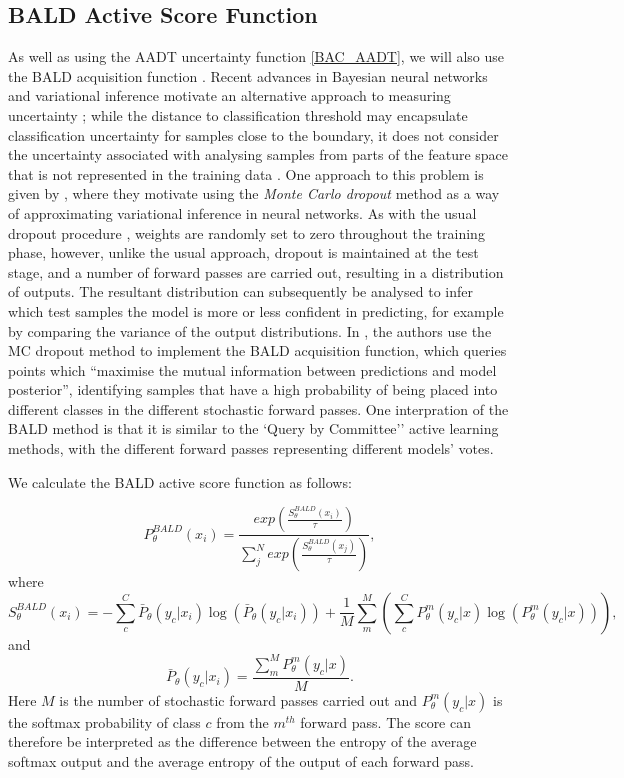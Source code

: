 \subsection{BALD Active Score Function}
As well as using the AADT uncertainty function \ref{BAC_AADT}, we will also use the BALD acquisition function\cite{houlsby2011bayesian} \cite{gal2017deep}. Recent advances in Bayesian neural networks and variational inference motivate an alternative approach to measuring uncertainty \cite{gal2016uncertainty}; while the distance to classification threshold may encapsulate classification uncertainty for samples close to the boundary, it does not consider the uncertainty associated with analysing samples from parts of the feature space that is not represented in the training data \cite{gal2016uncertainty}. One approach to this problem is given by \cite{gal2016dropout}, where they motivate using the \textit{Monte Carlo dropout} method as a way of approximating variational inference in neural networks. As with the usual dropout procedure \cite{srivastava2014dropout}, weights are randomly set to zero throughout the training phase, however, unlike the usual approach, dropout is maintained at the test stage, and a number of forward passes are carried out, resulting in a distribution of outputs. The resultant distribution can subsequently be analysed to infer which test samples the model is more or less confident in predicting, for example by comparing the variance of the output distributions. In \cite{gal2017deep}, the authors use the MC dropout method to implement the BALD acquisition function, which queries points which ``maximise the mutual information between predictions and model posterior'', identifying samples that have a high probability of being placed into different classes in the different stochastic forward passes. One interpration of the BALD method is that it is similar to the `Query by Committee'' active learning methods, with the different forward passes representing different models' votes. 

We calculate the BALD active score function as follows:

\begin{equation}
P_{\theta}^{BALD} (x_i) = \frac{exp(\frac{S^{BALD}_{\theta}(x_i)}{\tau})}{\sum_{j}^{N} exp(\frac{S^{BALD}_{\theta}(x_j)}{\tau})},
\end{equation}
where
\begin{equation}
S^{BALD}_{\theta}(x_i) = - \sum_{c}^{C} \bar{P}_{\theta}(y_c|x_i)\log( \bar{P}_{\theta}(y_c|x_i)) + \frac{1}{M} \sum_{m}^{M} (\sum_{c}^{C} P^{m}_{\theta}(y_c|x)\log(P^{m}_{\theta}(y_c|x))),
\end{equation}
and
\begin{equation}
 \bar{P}_{\theta}(y_c|x_i) = \frac{\sum_{m}^{M}P^{m}_{\theta}(y_c|x)}{M}. 
\end{equation}
Here $M$ is the number of stochastic forward passes carried out and $P^{m}_{\theta}(y_c|x)$ is the softmax probability of class $c$ from the $m^{th}$ forward pass. The score can therefore be interpreted as the difference between the entropy of the average softmax output and the average entropy of the output of each forward pass.
 
